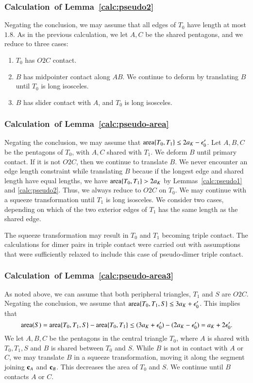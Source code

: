 \subsubsection{Calculation~of Lemma~\ref{calc:pseudo2}} 
Negating the conclusion, we may assume that all edges of $T_0$ have length at most $1.8$.  As in the previous calculation, we let
$A,C$ be the shared pentagons, and we reduce to three cases:
\begin{enumerate}
\item $T_0$ has $O2C$ contact.
\item $B$ has midpointer contact along $AB$.  We continue to deform by translating $B$ until $T_0$ is long isosceles.
\item $B$ has slider contact with $A$, and $T_0$ is long isosceles.
\end{enumerate}

\subsubsection{Calculation~of Lemma~\ref{calc:pseudo-area}} 
Negating the conclusion, we may assume that ${\operatorname{area}}\{T_0,T_1\}\le 2a_K - \epsilon_0'$.  Let $A,B,C$ be the pentagons of $T_0$,
with $A,C$ shared with $T_1$.  We deform $B$ until primary contact.  If it is not $O2C$, then we continue to translate $B$.
We never encounter an edge length constraint while translating $B$ becaue if the longest edge and shared length have equal
lengths, we have ${\operatorname{area}}\{T_0,T_1\} > 2a_K$ by Lemmas~\ref{calc:pseudo1} and \ref{calc:pseudo2}.  Thus, we always reduce
to $O2C$ on $T_0$.  We may continue with a squeeze transformation until $T_1$ is long isosceles.  We consider two cases,
depending on which of the two exterior edges of $T_1$ has the same length as the shared edge.

The squeeze transformation may result in $T_0$ and $T_1$ becoming triple contact.  
The calculations for dimer pairs in triple contact were carried out with assumptions that were sufficiently relaxed to include
this case of pseudo-dimer triple contact.

\subsubsection{Calculation~of Lemma~\ref{calc:pseudo-area3}}
As noted above, we can assume that both peripheral triangles, $T_1$ and $S$ are $O2C$.
Negating the conclusion, we assume that ${\operatorname{area}}\{T_0,T_1,S\}\le 3a_K+\epsilon_0'$.  This implies that
\[
{\operatorname{area}}(S) = {\operatorname{area}}\{T_0,T_1,S\} - {\operatorname{area}}\{T_0,T_1\} \le (3a_K+\epsilon_0') - (2a_K - \epsilon_0') = a_K + 2\epsilon_0'.
\]
We let $A,B,C$ be the pentagons in the central triangle $T_0$, where $A$ is shared with $T_0,T_1,S$ and
$B$ is shared between $T_0$ and $S$.  While $B$ is not in contact with $A$ or $C$, we may translate $B$
in a squeeze transformation, moving it along the segment joining ${\mathbf c}_A$ and ${\mathbf c}_B$.  This decreases the
area of $T_0$ and $S$.  We continue until $B$ contacts $A$ or $C$.


